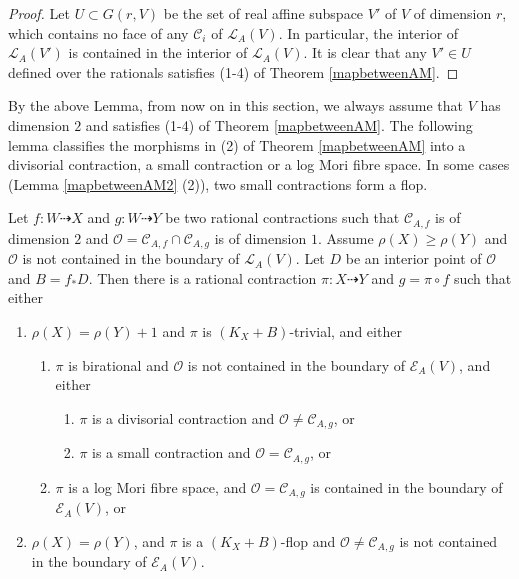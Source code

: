 \begin{proof}
  Let $U \subset G(r, V) $ be the set of real affine subspace  $V'$ of $V$ of dimension $r$, which contains no face of any $\mathcal{C}_{i}$ of $\mathcal{L}_A(V)$. In particular, the interior of  $\mathcal{L}_{A}(V')$ is contained in the interior of $\mathcal{L}_{A}(V)$. It is clear that any $V'\in U$ defined over the rationals satisfies (1-4) of Theorem \ref{mapbetweenAM}.
\end{proof}

By the above Lemma, from now on in this section, we always assume that $V$ has dimension $2$ and satisfies (1-4) of Theorem \ref{mapbetweenAM}. The following lemma classifies the morphisms in (2) of Theorem \ref{mapbetweenAM} into a divisorial contraction, a small contraction or a log Mori fibre space. In some cases (Lemma \ref{mapbetweenAM2} (2)), two small contractions form a flop.

\begin{lemma}\label{mapbetweenAM2}
  \cite[Lemma 3.5]{haconSarkisovProgram2012} Let $ f:W\dashrightarrow X $ and $ g:W\dashrightarrow  Y $ be two rational contractions such that $ \mathcal{C}_{A,f} $ is of dimension $ 2 $ and $ \mathcal{O}=\mathcal{C}_{A,f}\cap \mathcal{C}_{A,g} $ is of dimension $ 1 $. Assume $ \rho(X)\geqslant \rho(Y) $ and $ \mathcal{O} $ is not contained in the boundary of $ \mathcal{L}_{A}(V) $. Let $ D $ be an interior point of $ \mathcal{O} $ and $ B=f_*D $. Then there is a rational contraction $ \pi:X\dashrightarrow Y $ and $ g=\pi\circ f $ such that either
  \begin{enumerate}
    \item $ \rho(X)=\rho(Y)+1 $ and $ \pi  $ is $ (K_X+B) $-trivial, and either
          \begin{enumerate}
            \item $ \pi $ is birational and $ \mathcal{O} $ is not contained in the boundary of $ \mathcal{E}_A(V) $, and either
                  \begin{enumerate}
                    \item $ \pi $ is a divisorial contraction and $ \mathcal{O}\neq \mathcal{C}_{A,g} $, or
                    \item $ \pi $ is a small contraction and $ \mathcal{O}= \mathcal{C}_{A,g} $, or
                  \end{enumerate}
            \item $ \pi $ is a log Mori fibre space, and $ \mathcal{O}=\mathcal{C}_{A,g} $ is contained in the boundary of $ \mathcal{E}_{A}(V) $, or
          \end{enumerate}
    \item $ \rho(X)=\rho(Y) $, and $ \pi $ is  a $ (K_X+B) $-flop and $ \mathcal{O}\neq\mathcal{C}_{A,g} $ is not contained in the boundary of $ \mathcal{E}_A(V) $.
  \end{enumerate}
\end{lemma}

